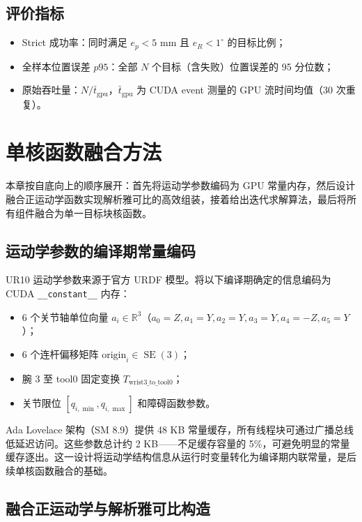 \documentclass[twocolumn,a4paper,10pt]{ctexart}
\DeclareMathOperator{\SE}{SE}
\newcommand{\R}{\mathbb{R}}
\begin{document}
\subsection{评价指标}

\begin{itemize}
  \item Strict 成功率：同时满足 $e_p<5$ mm 且 $e_R<1^\circ$ 的目标比例；
  \item 全样本位置误差 $p95$：全部 $N$ 个目标（含失败）位置误差的 95 分位数；
  \item 原始吞吐量：$N/\bar{t}_{\mathrm{gpu}}$，$\bar{t}_{\mathrm{gpu}}$ 为 CUDA event 测量的 GPU 流时间均值（30 次重复）。
\end{itemize}

\section{单核函数融合方法}

本章按自底向上的顺序展开：首先将运动学参数编码为 GPU 常量内存，然后设计融合正运动学函数实现解析雅可比的高效组装，接着给出迭代求解算法，最后将所有组件融合为单一目标块核函数。

\subsection{运动学参数的编译期常量编码}

UR10 运动学参数来源于官方 URDF 模型\cite{urdf}。将以下编译期确定的信息编码为 CUDA \texttt{\_\_constant\_\_} 内存：

\begin{itemize}
  \item 6 个关节轴单位向量 $a_i\in\R^3$（$a_0=Z,a_1=Y,a_2=Y,a_3=Y,a_4=-Z,a_5=Y$）；
  \item 6 个连杆偏移矩阵 $\mathrm{origin}_i\in\SE(3)$；
  \item 腕 3 至 tool0 固定变换 $T_{\mathrm{wrist3\_to\_tool0}}$；
  \item 关节限位 $[q_{i,\min},q_{i,\max}]$ 和障碍函数参数。
\end{itemize}

Ada Lovelace 架构（SM 8.9）提供 48 KB 常量缓存，所有线程块可通过广播总线低延迟访问。这些参数总计约 2 KB——不足缓存容量的 5\%，可避免明显的常量缓存逐出。这一设计将运动学结构信息从运行时变量转化为编译期内联常量，是后续单核函数融合的基础。

\subsection{融合正运动学与解析雅可比构造}
\end{document}
